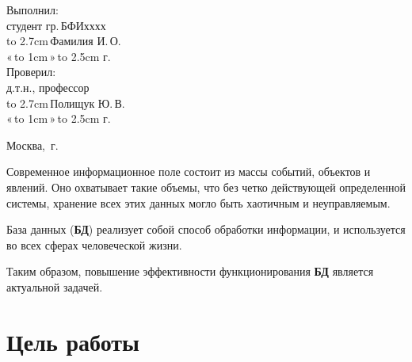 \documentclass[14pt]{extarticle}
\makeatletter
\newcommand{\hrf}[1]{\hbox to #1{\hrulefill}}%
\newcounter{sectionc}%
\newcommand{\numbersections}{\renewcommand{\Hy@numberline}[1]{##1~}}
\newcommand{\nonumbersections}{\renewcommand{\Hy@numberline}[1]{}}
\let\oldsection\section
\renewcommand{\section}{\numbersections\oldsection}
\let\oldsectionc\sectionc
\renewcommand{\sectionc}{\nonumbersections\oldsectionc}
\renewcommand\tableofcontents{
	\pdfbookmark[sectionc]{\contentsname}{toc} %
	\sectionc*{\contentsname
		\@mkboth{\contentsname}{\contentsname}}
	\@starttoc{toc}
}
\makeatother
\begin{document}
\vfill%

\hfill%
\begin{minipage}{0.45\textwidth}%
	Выполнил:\\[2mm]
	студент гр.\,БФИхххх\\[2mm]
	\hrf{2.7cm}\,Фамилия И.\,О.\\[2mm]
	«\,\hrf{1cm}\,»\,\hrf{2.5cm}\,\the\year{}\,г.\\
	
	Проверил:\\[2mm]
	д.т.н., профессор\\[2mm]
	\hrf{2.7cm}\,Полищук Ю.\,В.\\[2mm]
	«\,\hrf{1cm}\,»\,\hrf{2.5cm}\,\the\year{}\,г.
\end{minipage}

\vfill

\centerline{Москва, \the\year{}\,г.}%
\thispagestyle{empty}%
\newpage%
\tableofcontents%
\newpage%

Современное информационное поле состоит из массы событий, объектов и явлений. Оно охватывает такие объемы, что без четко действующей определенной системы, хранение всех этих данных могло быть хаотичным и неуправляемым\cite{kon2017}. %

База данных (\textbf{БД}) реализует собой способ обработки информации, и используется во всех сферах человеческой жизни.

Таким образом, повышение эффективности функционирования \textbf{БД} является актуальной задачей.

\section{Цель работы}%
\end{document}
